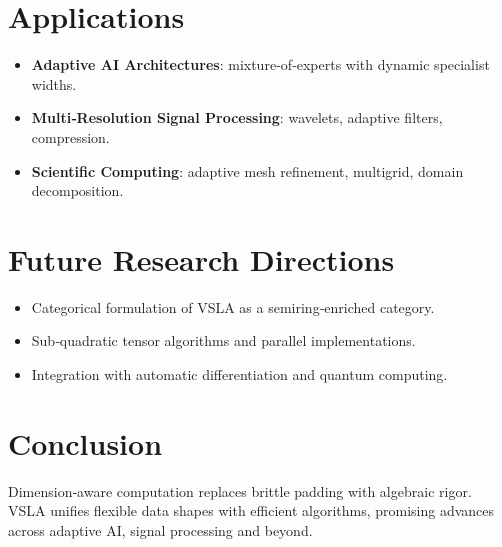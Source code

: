 \documentclass[11pt]{article}
\begin{document}
\section{Applications}
\begin{samepage}
\begin{itemize}[leftmargin=1.5em]
  \item \textbf{Adaptive AI Architectures}: mixture‑of‑experts with dynamic specialist widths.
  \item \textbf{Multi‑Resolution Signal Processing}: wavelets, adaptive filters, compression.
  \item \textbf{Scientific Computing}: adaptive mesh refinement, multigrid, domain decomposition.
\end{itemize}
\end{samepage}

\section{Future Research Directions}
\begin{itemize}[leftmargin=1.5em]
  \item Categorical formulation of VSLA as a semiring‑enriched category.
  \item Sub‑quadratic tensor algorithms and parallel implementations.
  \item Integration with automatic differentiation and quantum computing.
\end{itemize}

\clearpage
\section{Conclusion}
Dimension‑aware computation replaces brittle padding with algebraic rigor.  VSLA unifies flexible data shapes with efficient algorithms, promising advances across adaptive AI, signal processing and beyond.
\end{document}
